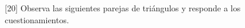 [20] Observa las siguientes parejas de tri\'angulos y responde a los cuestionamientos.

\begin{parts}
    
    
\end{parts}

